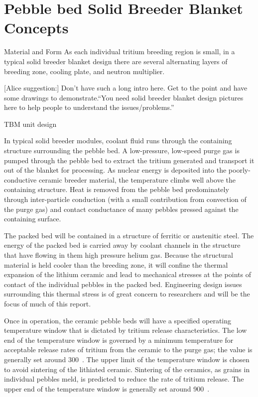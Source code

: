 \section{Pebble bed Solid Breeder Blanket Concepts}\label{sec:blanket-design}

Material and Form
As each individual tritium breeding region is small, in a typical solid breeder blanket design there are several alternating layers of breeding zone, cooling plate, and neutron multiplier. 

[Alice suggestion:] Don't have such a long intro here. Get to the point and have some drawings to demonstrate.``You need solid breeder blanket design pictures here to help people to understand the issues/problems.''


TBM unit design

In typical solid breeder modules, coolant fluid runs through the containing structure surrounding the pebble bed. A low-pressure, low-speed purge gas is pumped through the pebble bed to extract the tritium generated and transport it out of the blanket for processing. As nuclear energy is deposited into the poorly-conductive ceramic breeder material, the temperature climbs well above the containing structure. Heat is removed from the pebble bed predominately through inter-particle conduction (with a small contribution from convection of the purge gas) and contact conductance of many pebbles pressed against the containing surface. 

The packed bed will be contained in a structure of ferritic or austenitic steel. The energy of the packed bed is carried away by coolant channels in the structure that have flowing in them high pressure helium gas. Because the structural material is held cooler than the breeding zone, it will confine the thermal expansion of the lithium ceramic and lead to mechanical stresses at the points of contact of the individual pebbles in the packed bed. Engineering design issues surrounding this thermal stress is of great concern to researchers and will be the focus of much of this report.

Once in operation, the ceramic pebble beds will have a specified operating temperature window that is dictated by tritium release characteristics. The low end of the temperature window is governed by a minimum temperature for acceptable release rates of tritium from the ceramic to the purge gas; the value is generally set around 300~\celsius. The upper limit of the temperature window is chosen to avoid sintering of the lithiated ceramic. Sintering of the ceramics, as grains in individual pebbles meld, is predicted to reduce the rate of tritium release. The upper end of the temperature window is generally set around 900~\celsius.

